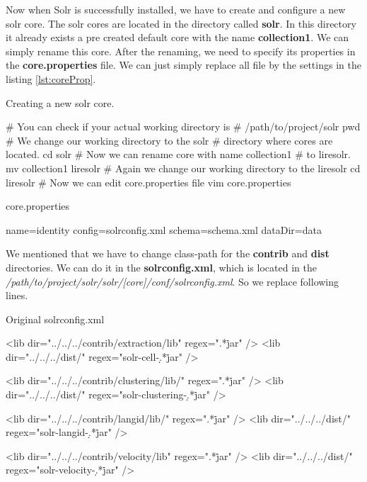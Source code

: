 \documentclass[12pt,a4paper]{report}
\begin{document}
Now when Solr is successfully installed, we have to create and configure a new solr core. The solr cores are located in the directory called \textbf{solr}. In this directory it already exists a pre created default core with the name \textbf{collection1}. We can simply rename this core. After the renaming, we need to specify its properties in the \textbf{core.properties} file. We can just simply replace all file by the settings in the listing \ref{lst:coreProp}.

\begin{listing}[H]
\caption{Creating a new solr core.}
\begin{bashcode}
# You can check if your actual working directory is
# /path/to/project/solr
pwd
# We change our working directory to the solr
# directory where cores are located.
cd solr
# Now we can rename core with name collection1
# to liresolr.
mv collection1 liresolr
# Again we change our working directory to the liresolr
cd liresolr
# Now we can edit core.properties file
vim core.properties
\end{bashcode}
\end{listing}

\begin{listing}[H]
\caption{core.properties}
\label{lst:coreProp}
\begin{propertiescode}
name=identity
config=solrconfig.xml
schema=schema.xml
dataDir=data
\end{propertiescode}
\end{listing}

We mentioned that we have to change class-path for the \textbf{contrib} and \textbf{dist} directories. We can do it in the \textbf{solrconfig.xml}, which is located in the \textit{/path/to/project/solr/solr/[core]/conf/solrconfig.xml}. So we replace following lines.

\begin{listing}[H]
\caption{Original solrconfig.xml}
\begin{xmlcode}
<lib dir="../../../contrib/extraction/lib" regex=".*\.jar" />
<lib dir="../../../dist/" regex="solr-cell-\d.*\.jar" />

<lib dir="../../../contrib/clustering/lib/" regex=".*\.jar" />
<lib dir="../../../dist/" regex="solr-clustering-\d.*\.jar" />

<lib dir="../../../contrib/langid/lib/" regex=".*\.jar" />
<lib dir="../../../dist/" regex="solr-langid-\d.*\.jar" />

<lib dir="../../../contrib/velocity/lib" regex=".*\.jar" />
<lib dir="../../../dist/" regex="solr-velocity-\d.*\.jar" />
\end{xmlcode}
\end{listing}
\end{document}
